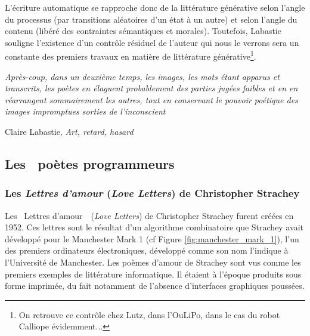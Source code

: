 \documentclass{article}
\newenvironment{citationbox}
{\begin{center}
		\begin{minipage}{.8\textwidth}
		}
		{
		\end{minipage}	
\end{center}
}
\begin{document}
				L'écriture automatique se rapproche donc de la littérature générative selon l'angle du processus (par transitions aléatoires d'un état à un autre) et selon l'angle du contenu (libéré des contraintes sémantiques et morales). Toutefois, Labastie souligne l'existence d'un contrôle résiduel de l'auteur qui nous le verrons sera un constante des premiers travaux en matière de littérature générative\footnote{On retrouve ce contrôle chez Lutz, dans l'OuLiPo, dans le cas du robot Calliope évidemment...}.
				\begin{citationbox}
					\textit{Après-coup, dans un deuxième temps, les images, les mots étant apparus et transcrits, les poètes en élaguent probablement des parties jugées faibles et en en réarrangent sommairement les autres, tout en conservant le pouvoir poétique des images impromptues sorties de l'inconscient}
					\begin{flushright}
						Claire Labastie, \textit{Art, retard, hasard}\autocite{labastie2016}
					\end{flushright}
				\end{citationbox}
				
		\subsection{Les \guillemotleft~poètes programmeurs~\guillemotright}
			\subsubsection{Les \textit{Lettres d'amour} (\textit{Love Letters}) de Christopher Strachey}
				Les \guillemotleft~Lettres d'amour~\guillemotright~(\textit{Love Letters}) de Christopher Strachey furent créées en 1952. Ces lettres sont le résultat d'un algorithme combinatoire que Strachey avait développé pour le Manchester Mark 1 (cf Figure \ref{fig:manchester_mark_1}), l'un des premiers ordinateurs électroniques, développé comme son nom l'indique à l'Université de Manchester. Les poèmes d'amour de Strachey sont vus comme les premiers exemples de littérature informatique. Il étaient à l'époque produits sous forme imprimée, du fait notamment de l'absence d'interfaces graphiques poussées.
				
\end{document}
